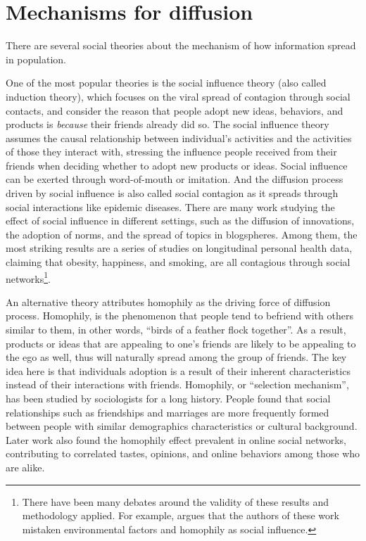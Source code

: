 \documentclass[phd,tocprelim]{cornell}
\begin{document}
\section{Mechanisms for diffusion}
There are several social theories about the mechanism of how information spread in population. 

One of the most popular theories is the social influence theory (also called induction theory), which focuses on the viral spread of contagion through social contacts, and consider the reason that people adopt new ideas, behaviors, and products is \emph{because} their friends already did so. The social influence theory assumes the causal relationship between individual's activities and the activities of those they interact with, stressing the influence people received from their friends when deciding whether to adopt new products or ideas. Social influence can be exerted through word-of-mouth or imitation. And the diffusion process driven by social influence is also called social contagion as it spreads through social interactions like epidemic diseases. There are many work studying the effect of social influence in different settings, such as the diffusion of innovations\cite{strang-1998}, the adoption of norms\cite{Axelrod-1986}, and the spread of topics in blogspheres\cite{Java-2006}. Among them, the most striking results are a series of studies on longitudinal personal health data, claiming that obesity\cite{Christakis-2007}, happiness\cite{Fowler-2008}, and smoking\cite{Christakis-2008}, are all contagious through social networks\footnote{There have been many debates around the validity of these results and methodology applied. For example, \cite{CohenCole-2008, Lyons-2010} argues that the authors of these work mistaken environmental factors and homophily as social influence.}. 

An alternative theory attributes homophily as the driving force of diffusion process. Homophily, is the phenomenon that people tend to befriend with others similar to them, in other words, ``birds of a feather flock together''. As a result, products or ideas that are appealing to one's friends are likely to be appealing to the ego as well, thus will naturally spread among the group of friends. The key idea here is that individuals adoption is a result of their inherent characteristics instead of their interactions with friends. Homophily, or ``selection mechanism'', has been studied by sociologists for a long history. People found that social relationships such as friendships and marriages are more frequently formed between people with similar demographics characteristics or cultural background\cite{lazarsfeld-1954,mcpherson-2001}. Later work also found the homophily effect prevalent in online social networks, contributing to correlated tastes, opinions, and online behaviors among those who are alike\cite{Liben-Nowell-2005,kossinets-2006,Kossinets-2009}.
\end{document}
